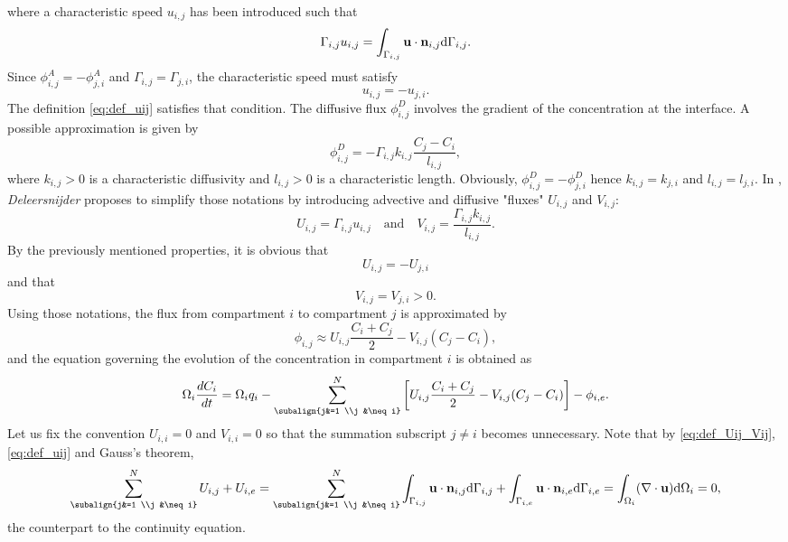 where a characteristic speed $u_{i,j}$ has been introduced such that
\begin{equation} \label{eq:def_uij}
	\Gamma_{i,j}u_{i,j} = \int_{\Gamma_{i,j}}\mathbf u \cdot \mathbf n_{i,j} \mathrm d\Gamma_{i,j}.
\end{equation}
Since $\phi_{i,j}^A = - \phi_{j,i}^A$ and $\Gamma_{i,j} = \Gamma_{j,i}$, the characteristic speed must satisfy
\begin{equation}
	u_{i,j} = - u_{j,i}.
\end{equation}
The definition \eqref{eq:def_uij} satisfies that condition.
The diffusive flux $\phi_{i,j}^D$ involves the gradient of the concentration at the interface. A possible approximation is given by
\begin{equation}
	\phi_{i,j}^D = - \Gamma_{i,j} k_{i,j} \frac{C_j-C_i}{l_{i,j}},
\end{equation}
where $k_{i,j} > 0$ is a characteristic diffusivity and $l_{i,j} > 0$ is a characteristic length. Obviously, $\phi_{i,j}^D = -\phi_{j,i}^D$ hence $k_{i,j} = k_{j,i}$ and $l_{i,j} = l_{j,i}$. In \cite{deleersnijder2014compartment}, \textit{Deleersnijder} proposes to simplify those notations by introducing advective and diffusive "fluxes" $U_{i,j}$ and $V_{i,j}$:
\begin{equation} \label{eq:def_Uij_Vij}
	U_{i,j} = \Gamma_{i,j}u_{i,j} \quad \mbox{and} \quad V_{i,j} = \frac{\Gamma_{i,j}k_{i,j}}{l_{i,j}}.
\end{equation}
By the previously mentioned properties, it is obvious that 
\begin{equation} \label{eq:Uprop}
	U_{i,j} = -U_{j,i}
\end{equation} 
and that 
\begin{equation} \label{eq:Vprop}
	V_{i,j} = V_{j,i} > 0.
\end{equation}
Using those notations, the flux from compartment $i$ to compartment $j$ is approximated by
\begin{equation}
	\phi_{i,j} \approx U_{i,j} \frac{C_i + C_j}{2} - V_{i,j}(C_j - C_i),
\end{equation}
and the equation governing the evolution of the concentration in compartment $i$ is obtained as
\begin{equation} \label{eq:compartmentmodel}
	\Omega_i \frac{dC_i}{dt} = \Omega_i q_i - \sum_{\subalign{j&=1 \\j &\neq i}}^N \left[ U_{i,j}\frac{C_i + C_j}{2} - V_{i,j} (C_j-C_i)\right] - \phi_{i,e}.
\end{equation}
Let us fix the convention $U_{i,i} = 0$ and $V_{i,i} = 0$ so that the summation subscript $j \neq i$ becomes unnecessary.
Note that by \eqref{eq:def_Uij_Vij}, \eqref{eq:def_uij} and Gauss's theorem,
\begin{equation} \label{eq:continuitycompartment}
	\sum_{\subalign{j&=1 \\j &\neq i}}^N U_{i,j} + U_{i,e} = \sum_{\subalign{j&=1 \\j &\neq i}}^N \int_{\Gamma_{i,j}}\b u \cdot \b n_{i,j} \rm d\Gamma_{i,j} + \int_{\Gamma_{i,e}}\b u \cdot \b n_{i,e} \rm d\Gamma_{i,e} = \int_{\Omega_{i}} (\nabla \cdot \b u) \rm d\Omega_{i} = 0,
\end{equation}
the counterpart to the continuity equation.

